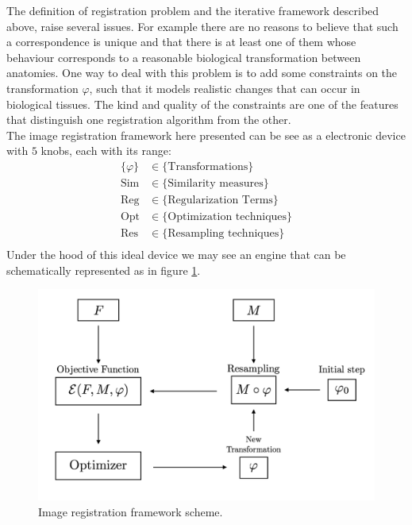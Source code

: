 The definition of registration problem and the iterative framework described above, raise several issues. For example there are no reasons to believe that such a correspondence is unique and that there is at least one of them whose behaviour corresponds to a reasonable biological transformation between anatomies. One way to deal with this problem is to add some constraints on the transformation $\varphi$, such that it models realistic changes that can occur in biological tissues. The kind and quality of the constraints are one of the features that distinguish one registration algorithm from the other. \\
The image registration framework here presented can be see as a electronic device with $5$ knobs, each with its range:
\begin{align*}
\{  \varphi \} &\in \{ \text{Transformations}\}\\
\text{Sim} &\in \{ \text{Similarity measures}\}\\
\text{Reg} &\in \{ \text{Regularization Terms}\}\\
\text{Opt} &\in \{ \text{Optimization techniques}\}\\
\text{Res} &\in \{ \text{Resampling techniques}\}\\
\end{align*}
Under the hood of this ideal device we may see an engine that can be schematically represented as in figure \ref{fig:iterative_algorithm_scheme}.

\begin{figure}[!ht]
	\centering
	\includegraphics[scale=0.235]{figures/iterative_algorithm.png}
	\caption{Image registration framework scheme.}
	\label{fig:iterative_algorithm_scheme}
\end{figure}

